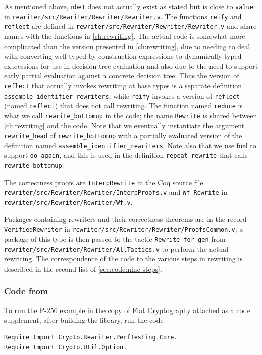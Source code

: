 \begin{subappendices}
As mentioned above, \verb|nbeT| does not actually exist as stated but is close to \verb|value'| in \texttt{rewriter/src/Rewriter/Rewriter/Rewriter.v}.
The functions \verb|reify| and \verb|reflect| are defined in \texttt{rewriter/src/Rewriter/Rewriter/Rewriter.v} and share names with the functions in \autoref{ch:rewriting}.
The actual code is somewhat more complicated than the version presented in \autoref{ch:rewriting}, due to needing to deal with converting well-typed-by-construction expressions to dynamically typed expressions for use in decision-tree evaluation and also due to the need to support early partial evaluation against a concrete decision tree.
Thus the version of \verb|reflect| that actually invokes rewriting at base types is a separate definition \verb|assemble_identifier_rewriters|, while \verb|reify| invokes a version of \verb|reflect| (named \verb|reflect|) that does not call rewriting.
The function named \texttt{reduce} is what we call \verb|rewrite_bottomup| in the code; the name \verb|Rewrite| is shared between \autoref{ch:rewriting} and the code.
Note that we eventually instantiate the argument \verb|rewrite_head| of \verb|rewrite_bottomup| with a partially evaluated version of the definition named \verb|assemble_identifier_rewriters|.
Note also that we use fuel to support \verb|do_again|, and this is used in the definition \verb|repeat_rewrite| that calls \verb|rewrite_bottomup|.

The correctness proofs are \verb|InterpRewrite| in the Coq source file \texttt{rewriter/src/Rewriter/Rewriter/InterpProofs.v} and \verb|Wf_Rewrite| in \texttt{rewriter/src/Rewriter/Rewriter/Wf.v}.

Packages containing rewriters and their correctness theorems are in the record \verb|VerifiedRewriter| in \texttt{rewriter/src/Rewriter/Rewriter/ProofsCommon.v};
a package of this type is then passed to the tactic \verb|Rewrite_for_gen| from \texttt{rewriter/src/Rewriter/Rewriter/AllTactics.v} to perform the actual rewriting.
The correspondence of the code to the various steps in rewriting is described in the second list of \autoref{sec:code:nine-steps}.

\subsubsection{Code from }

To run the P-256 example in the copy of Fiat Cryptography attached as a code supplement, after building the library, run the code
\begin{verbatim}
Require Import Crypto.Rewriter.PerfTesting.Core.
Require Import Crypto.Util.Option.


\end{verbatim}
\end{subappendices}
